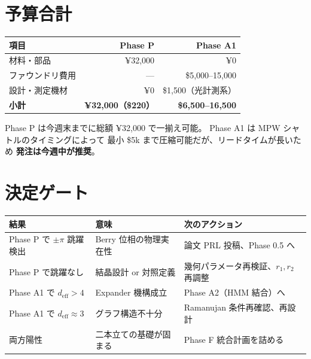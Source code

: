 \documentclass[11pt,a4paper]{article}
\begin{document}
\section{予算合計}

\begin{center}
\begin{tabular}{lrr}
\toprule
項目 & Phase P & Phase A1 \\
\midrule
材料・部品 & ¥32,000 & ¥0 \\
ファウンドリ費用 & — & \$5,000--15,000 \\
設計・測定機材 & ¥0 & \$1,500（光計測系） \\
\midrule
\textbf{小計} & \textbf{¥32,000（\$220）} & \textbf{\$6,500--16,500} \\
\bottomrule
\end{tabular}
\end{center}

Phase P は今週末までに総額 ¥32,000 で一揃え可能。
Phase A1 は MPW シャトルのタイミングによって
最小 \$5k まで圧縮可能だが、リードタイムが長いため
\textbf{発注は今週中が推奨}。

\section{決定ゲート}

\begin{center}
\begin{tabular}{lll}
\toprule
結果 & 意味 & 次のアクション \\
\midrule
Phase P で $\pm\pi$ 跳躍検出 & Berry 位相の物理実在性 & 論文 PRL 投稿、Phase 0.5 へ \\
Phase P で跳躍なし & 結晶設計 or 対照定義 & 幾何パラメータ再検証、$r_1, r_2$ 再調整 \\
Phase A1 で $d_{\mathrm{eff}}>4$ & Expander 機構成立 & Phase A2（HMM 結合）へ \\
Phase A1 で $d_{\mathrm{eff}} \approx 3$ & グラフ構造不十分 & Ramanujan 条件再確認、再設計 \\
両方陽性 & 二本立ての基礎が固まる & Phase F 統合計画を詰める \\
\bottomrule
\end{tabular}
\end{center}
\end{document}
